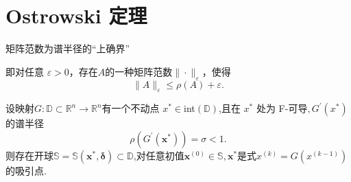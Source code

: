 \documentclass{lzureport}
\begin{document}
\section{Ostrowski 定理}

\begin{Thm}[Ostrowski定理]
	矩阵范数为谱半径的“\textcolor{YBXPurple}{上确界}”

	即对任意 $\varepsilon>0$，存在$A$的一种矩阵范数$\|\cdot\|_{\varepsilon}$，使得
	$$\|A\|_{\varepsilon}\leqslant\rho(A)+\varepsilon.$$
\end{Thm}	

设映射$G:\mathbb{D}\subset\mathbb{R}^n\to\mathbb{R}^n$有一个不动点 $x^*\in$int$(\mathbb{D})$,且在 $x^*$ 处为 F-可导$,G^\prime\left(x^*\right)$ 的谱半径
$$\rho\left(G^{\prime}\left(\boldsymbol{x}^*\right)\right)=\sigma<1.$$
则存在开球$\mathbb{S}=\mathbb{S}(\boldsymbol{x}^*,\boldsymbol{\delta})\subset\mathbb{D}$,对任意初值$\boldsymbol{x}^{(0)}\in\mathbb{S},\boldsymbol{x}^*$是式$x^{(k)} = G(x^{(k-1)}) $的吸引点.
\end{document}
